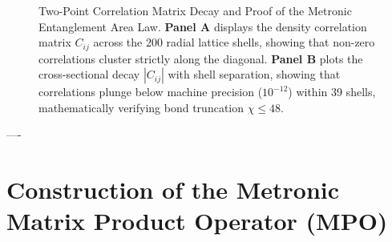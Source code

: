 \documentclass[
    12pt,
    a4paper,
    headings=normal,
    twoside=false,
    open=any,
    parskip=half
]{scrbook}
\begin{document}
\begin{figure}[htbp]
\caption{Two-Point Correlation Matrix Decay and Proof of the Metronic Entanglement Area Law. \textbf{Panel A} displays the density correlation matrix $C_{ij}$ across the 200 radial lattice shells, showing that non-zero correlations cluster strictly along the diagonal. \textbf{Panel B} plots the cross-sectional decay $|C_{ij}|$ with shell separation, showing that correlations plunge below machine precision ($10^{-12}$) within 39 shells, mathematically verifying bond truncation $\chi \le 48$.}
\label{fig:ch4_correlation_matrix_decay}
\end{figure}

----

\clearpage
\section{Construction of the Metronic Matrix Product Operator (MPO)}
\label{sec:ch4_mpo_construction}
\end{document}
